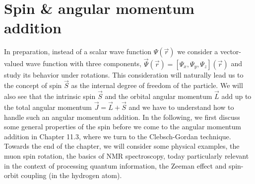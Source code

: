 \chapter{Spin \& angular momentum addition}
In preparation, instead of a scalar wave function $\Psi(\vec{r})$ we consider a vector-valued wave function with three components, $\vec{\Psi}(\vec{r})=[\Psi_x,\Psi_y,\Psi_z](\vec{r})$ and study its behavior under rotations. This consideration will naturally lead us to the concept of spin $\vec{S}$ as the internal degree of freedom of the particle. We will also see that the intrinsic spin $\vec{S}$ and the orbital angular momentum $\vec{L}$ add up to the total angular momentum $\vec{J}=\vec{L}+\vec{S}$ and we have to understand how to handle such an angular momentum addition. In the following, we first discuss some general properties of the spin before we come to the angular momentum addition in Chapter 11.3, where we turn to the Clebsch-Gordan technique. Towards the end of the chapter, we will consider some physical examples, the muon spin rotation, the basics of NMR spectroscopy, today particularly relevant in the context of processing quantum information, the Zeeman effect and spin-orbit coupling (in the hydrogen atom).

